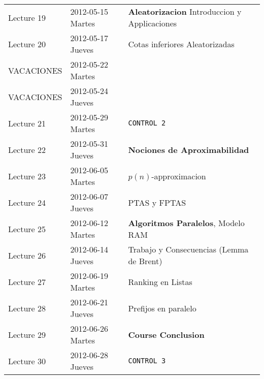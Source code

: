 \documentclass{article}
\begin{document}
\begin{center}
\begin{tabular}{lll}
 Lecture 19  &  2012-05-15 Martes  &  \textbf{Aleatorizacion} Introduccion y Applicaciones  \\
 Lecture 20  &  2012-05-17 Jueves  &  Cotas inferiores Aleatorizadas                        \\
 VACACIONES  &  2012-05-22 Martes  &                                                        \\
 VACACIONES  &  2012-05-24 Jueves  &                                                        \\
 Lecture 21  &  2012-05-29 Martes  &  \texttt{CONTROL 2}                                    \\
 Lecture 22  &  2012-05-31 Jueves  &  \textbf{Nociones de Aproximabilidad}                  \\
 Lecture 23  &  2012-06-05 Martes  &  $p(n)$-approximacion                                  \\
 Lecture 24  &  2012-06-07 Jueves  &  PTAS y FPTAS                                          \\
 Lecture 25  &  2012-06-12 Martes  &  \textbf{Algoritmos Paralelos}, Modelo RAM             \\
 Lecture 26  &  2012-06-14 Jueves  &  Trabajo y Consecuencias (Lemma de Brent)              \\
 Lecture 27  &  2012-06-19 Martes  &  Ranking en Listas                                     \\
 Lecture 28  &  2012-06-21 Jueves  &  Prefijos en paralelo                                  \\
 Lecture 29  &  2012-06-26 Martes  &  \textbf{Course Conclusion}                            \\
 Lecture 30  &  2012-06-28 Jueves  &  \texttt{CONTROL 3}                                    \\
\end{tabular}
\end{center}
\end{document}
